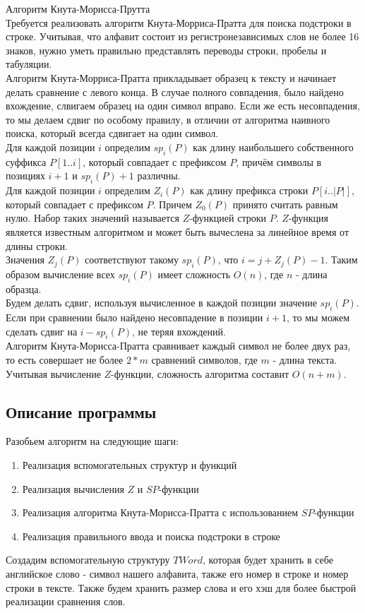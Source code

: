 \documentclass[12pt]{article}
\begin{document}
	Алгоритм Кнута-Морисса-Прутта 
	\\Требуется реализовать алгоритм Кнута-Морриса-Пратта для поиска 
	подстроки в строке. Учитывая, что алфавит состоит из регистронезависимых слов не более
	16 знаков, нужно уметь правильно представлять переводы строки, пробелы и табуляции.
	\\ Алгоритм Кнута-Морриса-Пратта прикладывает образец к тексту и начинает делать сравнение
	с левого конца. В случае полного совпадения, было найдено вхождение, слвигаем образец на один символ вправо. Если же есть
	несовпадения, то мы делаем сдвиг по особому правилу, в отличии от алгоритма наивного поиска, который всегда сдвигает на 
	один символ.
	\\Для каждой позиции $i$ определим $sp_i(P)$ как длину наибольшего собственного суффикса $P[1..i]$, который совпадает с префиксом
	$P$, причём символы в позициях $i+1$ и $sp_i(P) + 1$ различны.
	\\ Для каждой позиции $i$ определим $Z_i(P)$ как длину префикса строки $P[i..|P|]$, который совпадает с префиксом $P$. Причем $Z_0(P)$ принято считать равным нулю.
	Набор таких значений называется $Z$-функцией строки $P$. $Z$-функция является известным алгоритмом и может быть вычеслена за линейное время от длины строки.
	\\ Значения $Z_j(P)$ соответствуют такому $sp_i(P)$, что $i = j + Z_j(P) - 1$. Таким образом вычисление всех $sp_i(P)$ имеет сложность $O(n)$, где $n$ - длина образца.
	\\ Будем делать сдвиг, используя вычисленное в каждой позиции значение $sp_i(P)$. Если при сравнении было найдено несовпадение в позиции $i + 1$, то мы можем сделать сдвиг на $i - sp_i(P)$, не теряя вхождений.
	\\ Алгоритм Кнута-Морисса-Пратта сравнивает каждый символ не более двух раз, то есть совершает не более $2*m$ сравнений символов, где $m$ - длина текста. Учитывая вычисление $Z$-функции, сложность алгоритма составит $O(n + m)$.
	
	\subsection*{Описание программы}
	
	Разобьем алгоритм на следующие шаги:
	\begin{enumerate}
		\item Реализация вспомогательных структур и функций
		\item Реализация вычисления $Z$ и $SP$-функции
		\item Реализация алгоритма Кнута-Морисса-Пратта с использованием $SP$-функции
		\item Реализация правильного ввода и поиска подстроки в строке
	\end{enumerate}
	Создадим вспомогательную структуру $TWord$, которая будет хранить в себе английское слово - символ нашего алфавита, также его номер в строке и номер строки в тексте. Также будем хранить размер слова и его хэш для более быстрой реализации сравнения слов.
	
\end{document}
